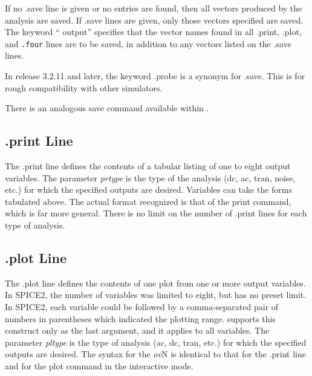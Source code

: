 If no {\vt .save} line is given or no entries are found, then all
vectors produced by the analysis are saved.  If {\vt .save} lines are
given, only those vectors specified are saved.  The keyword ``{\vt
output}'' specifies that the vector names found in all {\vt
.print}, {\vt .plot}, and {\tt .four} lines are to be saved, in
addition to any vectors listed on the {\vt .save} lines.

In {\WRspice} release 3.2.11 and later, the keyword {\vt .probe} is a
synonym for {\vt .save}.  This is for rough compatibility with other
simulators.

There is an analogous {\cb save} command available within {\WRspice}.

\subsection{{\vt .print} Line}

The {\vt .print} line defines the contents of a tabular listing of one
to eight output variables.  The parameter {\it prtype\/} is the type
of the analysis (dc, ac, tran, noise, etc.) for which the specified
outputs are desired.  Variables can take the forms tabulated above. 
The actual format recognized is that of the {\cb print} command, which
is far more general.  There is no limit on the number of {\vt .print}
lines for each type of analysis.

\subsection{{\vt .plot} Line}

The {\vt .plot} line defines the contents of one plot from one or more
output variables.  In SPICE2, the number of variables was limited to
eight, but {\WRspice} has no preset limit.  In SPICE2, each variable
could be followed by a comma-separated pair of numbers in parentheses
which indicated the plotting range.  {\WRspice} supports this
construct only as the last argument, and it applies to all variables. 
The parameter {\it pltype\/} is the type of analysis (ac, dc, tran,
etc.) for which the specified outputs are desired.  The syntax for the
{\it ov}N is identical to that for the {\vt .print} line and for the
{\cb plot} command in the interactive mode.

